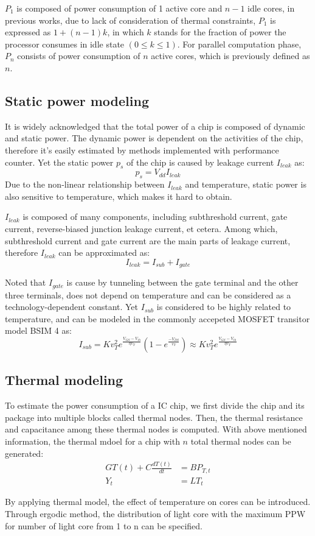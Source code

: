 $P_{1}$ is composed of power consumption of 1 active core and $n-1$ idle cores, in previous works, due to lack of consideration of thermal constraints, $P_{1}$ is expressed as $1+(n-1)k$, in which $k$ stands for the fraction of power the processor consumes in idle state $(0 \le k \le 1)$. For parallel computation phase, $P_{n}$ consists of power consumption of $n$ active cores, which is previously defined as $n$.

\subsection{Static power modeling}

It is widely acknowledged that the total power of a chip is composed of dynamic and static power. The dynamic power is dependent on the activities of the chip, therefore it's easily estimated by methods implemented with performance counter. Yet the static power $p_{s}$ of the chip is caused by leakage current $I_{leak}$ as:
\begin{equation}\label{ps}
p_{s} = V_{dd}I_{leak}
\end{equation}
Due to the non-linear relationship between $I_{leak}$ and temperature, static power is also sensitive to temperature, which makes it hard to obtain. 

$I_{leak}$ is composed of many components, including subthreshold current, gate current, reverse-biased junction leakage current, et cetera. Among which, subthreshold current and gate current are the main parts of leakage current, therefore $I_{leak}$ can be approximated as:
\begin{equation}\label{I_leak}
I_{leak}=I_{sub}+I_{gate}
\end{equation}

Noted that $I_{gate}$ is cause by tunneling between the gate terminal and the other three terminals, does not depend on temperature and can be considered as a technology-dependent constant. Yet $I_{sub}$ is considered to be highly related to temperature, and can be modeled in the commonly accepeted MOSFET transitor model BSIM 4 as:
\begin{equation}\label{I_sub}
I_{sub}=Kv_{T}^{2}e^{\frac{V_{GS}-V_{th}} {\eta v_{T}}} (1-e^{\frac {-V_{DS}} {v_{T}} })\approx Kv_{T}^{2}e^{\frac{V_{GS}-V_{th}}{\eta v_{T}}}
\end{equation}

\subsection{Thermal modeling}
To estimate the power consumption of a IC chip, we first divide the chip and its package into multiple blocks called thermal nodes. Then, the thermal resistance and capacitance among these thermal nodes is computed. With above mentioned information, the thermal mdoel for a chip with $n$ total thermal nodes can be generated:
\begin{equation}\label{gt=bp}
\begin{split}
GT(t) + C\frac{dT(t)}{dt} &= BP_{T,t}\\
Y_{t} &= LT_{t}
\end{split}
\end{equation}

By applying thermal model, the effect of temperature on cores can be introduced. 
Through ergodic method, the distribution of light core with the maximum PPW
for number of light core from 1 to n can be specified.




